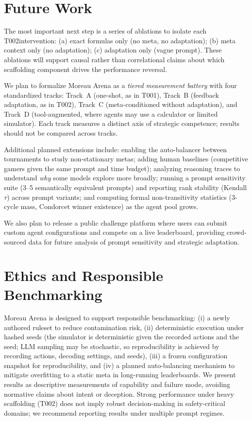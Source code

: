 \documentclass[11pt]{article}
\newcommand{\tOne}{T001}
\newcommand{\tTwo}{T002}
\begin{document}
\section{Future Work}
\label{sec:future}

The most important next step is a series of ablations to isolate each \tTwo intervention:
(a) exact formulas only (no meta, no adaptation);
(b) meta context only (no adaptation);
(c) adaptation only (vague prompt).
These ablations will support causal rather than correlational claims about which scaffolding component drives the performance reversal.

We plan to formalize Moreau Arena as a \emph{tiered measurement battery} with four standardized tracks:
Track~A (one-shot, as in \tOne),
Track~B (feedback adaptation, as in \tTwo),
Track~C (meta-conditioned without adaptation),
and Track~D (tool-augmented, where agents may use a calculator or limited simulator).
Each track measures a distinct axis of strategic competence; results should not be compared across tracks.

Additional planned extensions include:
enabling the auto-balancer between tournaments to study non-stationary metas;
adding human baselines (competitive gamers given the same prompt and time budget);
analyzing reasoning traces to understand \emph{why} some models explore more broadly;
running a prompt sensitivity suite (3--5 semantically equivalent prompts) and reporting rank stability (Kendall $\tau$) across prompt variants;
and computing formal non-transitivity statistics (3-cycle mass, Condorcet winner existence) as the agent pool grows.

We also plan to release a public challenge platform where users can submit custom agent configurations and compete on a live leaderboard, providing crowd-sourced data for future analysis of prompt sensitivity and strategic adaptation.

\section{Ethics and Responsible Benchmarking}

Moreau Arena is designed to support responsible benchmarking:
(i) a newly authored ruleset to reduce contamination risk,
(ii) deterministic execution under hashed seeds (the simulator is deterministic given the recorded actions and the seed; LLM sampling may be stochastic, so reproducibility is achieved by recording actions, decoding settings, and seeds),
(iii) a frozen configuration snapshot for reproducibility,
and (iv) a planned auto-balancing mechanism to mitigate overfitting to a static meta in long-running leaderboards.
We present results as descriptive measurements of capability and failure mode, avoiding normative claims about intent or deception.
Strong performance under heavy scaffolding (\tTwo) does not imply robust decision-making in safety-critical domains; we recommend reporting results under multiple prompt regimes.
\end{document}
